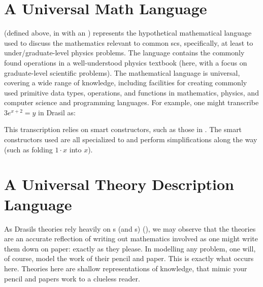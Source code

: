 
\section{A Universal Math Language}
\label{sec:modelkinds:language}

\originalExprHaskell

\Expr{} (defined above, in  with an )
represents the hypothetical mathematical language used to discuss the
mathematics relevant to common \acs{scs}, specifically, at least to
under/graduate-level physics problems. The language contains the commonly found
operations in a well-understood physics textbook (here, with a focus on
graduate-level scientific problems). The mathematical language is universal,
covering a wide range of knowledge, including facilities for creating commonly
used primitive data types, operations, and functions  in mathematics, physics,
and computer science and programming languages. For example, one might
transcribe \(3 e^{x + 2} = y\) in Drasil as:


This transcription relies on smart constructors, such as those in
. The smart constructors used are
all specialized to \Expr{} and perform simplifications along the way (such as
folding \(1 \cdot x\) into \(x\)).

\section{A Universal Theory Description Language}

As Drasils theories rely heavily on \Relation{}s (and \RelationConcept{}s)
(), we may observe
that the theories are an accurate reflection of writing out mathematics involved
as one might write them down on paper: exactly as they please. In modelling any
problem, one will, of course, model the work of their pencil and paper. This is
exactly what occurs here. Theories here are shallow representations of
knowledge, that mimic your pencil and papers work to a clueless reader.

